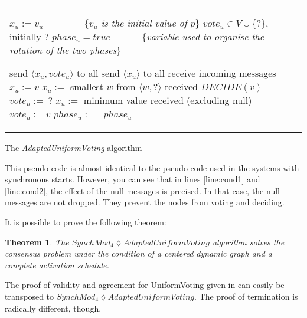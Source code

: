 \documentclass{article}
\newtheorem{theorem}{Theorem}
\begin{document}
\begin{algorithm}[htb]
\begin{distribalgo}[1]
\begin{tabular}{ll}
\begin{minipage}{33em}


\INDENT{\textbf{Initialisation:}}
	\STATE $x_u := v_u$ ~~~~~~~~\{\emph{$v_u$ is the initial value of $p$}\}
	\STATE $vote_u \in V\cup\{ ? \}$, initially $?$
	\STATE $phase_u = true$ ~~~~~~\{\textit{variable used to organise the rotation of the two phases}\}

\ENDINDENT
\BLANK

\INDENT{\textbf{Round $r$:}}
	\IF{$phase_u$}
		\STATE send $\langle x_u , vote_u \rangle$ to all
	\ELSE
		\STATE send $\langle x_u \rangle$ to all
	\ENDIF
	\STATE receive incoming messages
	\IF{$phase_u$}
		\IF{a node voted for $v$}
			\STATE $x_u:= v$
		\ELSE
			\STATE $x_u :=$ smallest  $w$ from  $\langle w , ? \rangle$ received
		\ENDIF
		\IF{every node voted for $v$, none sent null} \label{line:cond1}
			\STATE $DECIDE(v)$
		\ENDIF
		\STATE $vote_u :=\ ?$
	\ELSE
		\STATE $ x_u :=$ minimum value received (excluding null)
		\IF{every node sent $v$, none sent null} \label{line:cond2}
			\STATE $vote_u := v$
		\ENDIF
	\ENDIF
	\STATE $phase_u := \neg phase_u$
\ENDINDENT

\end{minipage}
\end{tabular}

\caption{The {\em AdaptedUniformVoting} algorithm}
\label{unifvotfig}
\end{distribalgo}
\end{algorithm}

This pseudo-code is almost identical to the pseudo-code used in the systems with synchronous starts.
However, you can see that in lines \ref{line:cond1} and \ref{line:cond2}, the effect of the null messages is precised.
In that case, the null messages are not dropped. They prevent the nodes from voting and deciding.

It is possible to prove the following theorem:

\begin{theorem}
	The $SynchMod_4 \lozenge AdaptedUniformVoting$ algorithm solves the consensus problem under the condition of a centered dynamic graph and a complete activation schedule.
\end{theorem}

The proof of validity and agreement for UniformVoting given in \cite{model_ho} can easily be transposed to \newline $SynchMod_4 \lozenge AdaptedUniformVoting$.
The proof of termination is radically different, though.
\end{document}
